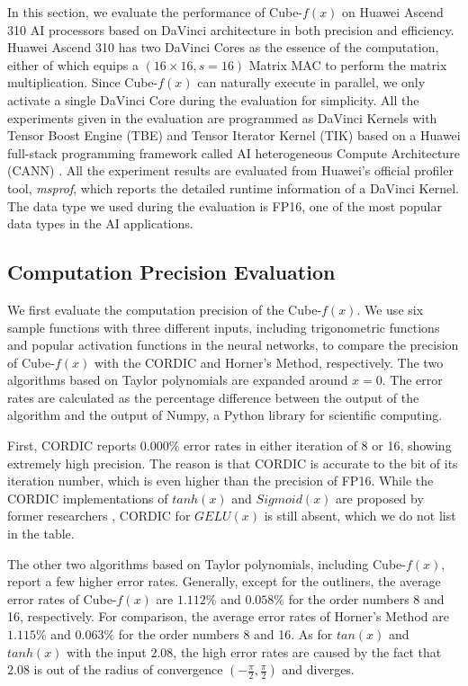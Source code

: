 \documentclass[12pt]{extbook}
\begin{document}
In this section, we evaluate the performance of Cube-$f(x)$ on Huawei Ascend 310 AI processors based on DaVinci architecture \cite{DBLP:conf/hotchips/LiaoTXZ19} in both precision and efficiency. Huawei Ascend 310 has two DaVinci Cores as the essence of the computation, either of which equips a $(16 \times 16, s = 16)$ Matrix MAC to perform the matrix multiplication. Since Cube-$f(x)$ can naturally execute in parallel, we only activate a single DaVinci Core during the evaluation for simplicity. All the experiments given in the evaluation are programmed as DaVinci Kernels with Tensor Boost Engine (TBE) and Tensor Iterator Kernel (TIK) based on a Huawei full-stack programming framework called AI heterogeneous Compute Architecture (CANN) \cite{CANN}. All the experiment results are evaluated from Huawei's official profiler tool, \textit{msprof}, which reports the detailed runtime information of a DaVinci Kernel. The data type we used during the evaluation is FP16, one of the most popular data types in the AI applications.

\subsection{Computation Precision Evaluation}

We first evaluate the computation precision of the Cube-$f(x)$. We use six sample functions with three different inputs, including trigonometric functions and popular activation functions in the neural networks, to compare the precision of Cube-$f(x)$ with the CORDIC and Horner's Method, respectively. The two algorithms based on Taylor polynomials are expanded around $x = 0$. The error rates are calculated as the percentage difference between the output of the algorithm and the output of Numpy, a Python library for scientific computing.

First, CORDIC reports $0.000\%$ error rates in either iteration of 8 or 16, showing extremely high precision. The reason is that CORDIC is accurate to the bit of its iteration number, which is even higher than the precision of FP16. While the CORDIC implementations of $tanh(x)$ and $Sigmoid(x)$ are proposed by former researchers \cite{DBLP:conf/iscas/ChenJLLFLY20}, CORDIC for $GELU(x)$ is still absent, which we do not list in the table. 

The other two algorithms based on Taylor polynomials, including Cube-$f(x)$, report a few higher error rates. Generally, except for the outliners, the average error rates of Cube-$f(x)$ are $1.112\%$ and $0.058\%$ for the order numbers 8 and 16, respectively. For comparison, the average error rates of Horner's Method are $1.115\%$ and $0.063\%$ for the order numbers 8 and 16. As for $tan(x)$ and $tanh(x)$ with the input $2.08$, the high error rates are caused by the fact that $2.08$ is out of the radius of convergence $(-\frac{\pi}{2}, \frac{\pi}{2})$ and diverges.
\end{document}
